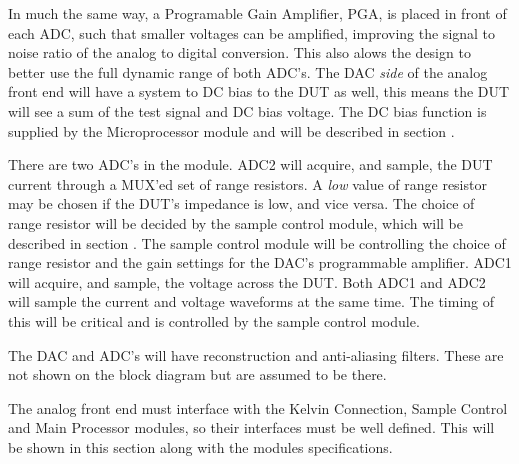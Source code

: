 In much the same way, a Programable Gain Amplifier, PGA, is placed in front of each ADC, such that smaller voltages can be amplified, improving the signal to noise ratio of the analog to digital conversion. This also alows the design to better use the full dynamic range of both ADC's. The DAC \textit{side} of the analog front end will have a system to DC bias to the DUT as well, this means the DUT will see a sum of the test signal and DC bias voltage. The DC bias function is supplied by the Microprocessor module and will be described in section .

There are two ADC's in the module. ADC2 will acquire, and sample, the DUT current through a MUX'ed set of range resistors. A \textit{low} value of range resistor may be chosen if the DUT's impedance is low, and vice versa. The choice of range resistor will be decided by the sample control module, which will be described in section . The sample control module will be controlling the choice of range resistor and the gain settings for the DAC's programmable amplifier. ADC1 will acquire, and sample, the voltage across the DUT. Both ADC1 and ADC2 will sample the current and voltage waveforms at the same time. The timing of this will be critical and is controlled by the sample control module.

The DAC and ADC's will have reconstruction and anti-aliasing filters. These are not shown on the block diagram but are assumed to be there.

The analog front end must interface with the Kelvin Connection, Sample Control and Main Processor modules, so their interfaces must be well defined. This will be shown in this section along with the modules specifications.

